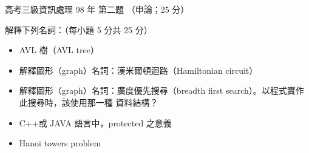 \begin{pastexam}[label={px:gk3-098-ds-02}]{高考三級資訊處理 98 年 第二題}
（申論；25 分）

解釋下列名詞：（每小題 5 分共 25 分）
\begin{itemize}[leftmargin=2.2em]
\item[㈠] AVL 樹（AVL tree）
\item[㈡] 解釋圖形（graph）名詞：漢米爾頓迴路（Hamiltonian circuit）
\item[㈢] 解釋圖形（graph）名詞：廣度優先搜尋（breadth first search）。以程式實作此搜尋時，該使用那一種
資料結構？
\item[㈣] C++或 JAVA 語言中，protected 之意義
\item[㈤] Hanoi towers problem
\end{itemize}
\end{pastexam}

